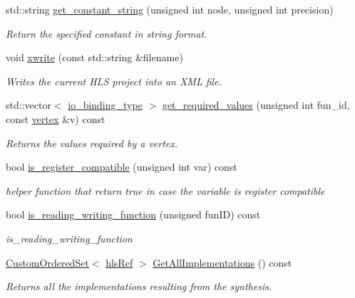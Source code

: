 \begin{DoxyCompactItemize}
std\+::string \hyperlink{classHLS__manager_adb55871297598407cb473ef10647048b}{get\+\_\+constant\+\_\+string} (unsigned int node, unsigned int precision)
\begin{DoxyCompactList}\small\item\em Return the specified constant in string format. \end{DoxyCompactList}\item 
void \hyperlink{classHLS__manager_adc098d176fadc4a0fb07eeb325022b6d}{xwrite} (const std\+::string \&filename)
\begin{DoxyCompactList}\small\item\em Writes the current H\+LS project into an X\+ML file. \end{DoxyCompactList}\item 
std\+::vector$<$ \hyperlink{classHLS__manager_a972627cc658afa992590b9d2bf1a1e87}{io\+\_\+binding\+\_\+type} $>$ \hyperlink{classHLS__manager_a478b55ce1c14b09a98e3aa266bdde269}{get\+\_\+required\+\_\+values} (unsigned int fun\+\_\+id, const \hyperlink{graph_8hpp_abefdcf0544e601805af44eca032cca14}{vertex} \&v) const
\begin{DoxyCompactList}\small\item\em Returns the values required by a vertex. \end{DoxyCompactList}\item 
bool \hyperlink{classHLS__manager_afb452aef787733de4a11d00cc4e1f36a}{is\+\_\+register\+\_\+compatible} (unsigned int var) const
\begin{DoxyCompactList}\small\item\em helper function that return true in case the variable is register compatible \end{DoxyCompactList}\item 
bool \hyperlink{classHLS__manager_a2f8e9a8fb92f0d197f5b5e0eee2821bc}{is\+\_\+reading\+\_\+writing\+\_\+function} (unsigned fun\+ID) const
\begin{DoxyCompactList}\small\item\em is\+\_\+reading\+\_\+writing\+\_\+function \end{DoxyCompactList}\item 
\hyperlink{classCustomOrderedSet}{Custom\+Ordered\+Set}$<$ \hyperlink{hls_8hpp_a75d0c73923d0ddfa28c4843a802c73a7}{hls\+Ref} $>$ \hyperlink{classHLS__manager_a86f96e84a4f71c2d6a5edac106fad44d}{Get\+All\+Implementations} () const
\begin{DoxyCompactList}\small\item\em Returns all the implementations resulting from the synthesis. \end{DoxyCompactList}\item 

\end{DoxyCompactItemize}
